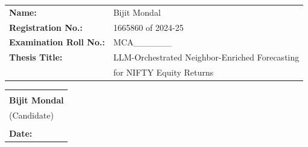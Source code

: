 \documentclass[12pt,a4paper,titlepage]{article}
\begin{document}
\begin{titlepage}
\begin{minipage}{0.9\textwidth}
        \vspace{0.5cm}
        
        \begin{tabular}{ll}
            \textbf{Name:} & Bijit Mondal \\
            \textbf{Registration No.:} & 1665860 of 2024-25 \\
            \textbf{Examination Roll No.:} & MCA\_\_\_\_\_\_ \\
            \textbf{Thesis Title:} & LLM-Orchestrated Neighbor-Enriched Forecasting \\
            & for NIFTY Equity Returns \\
        \end{tabular}
        
    \end{minipage}
    
    \vspace{1.2cm}
    
    \begin{tabular}{p{}}
        \hline \\[-0.6em]
        \textbf{Bijit Mondal} \\
        (Candidate) \\[0.8cm]
        \hline \\[-0.6em]
        \textbf{Date:} \hfill  \\
    \end{tabular}
    
    \vfill
    
\end{titlepage}
\end{document}
